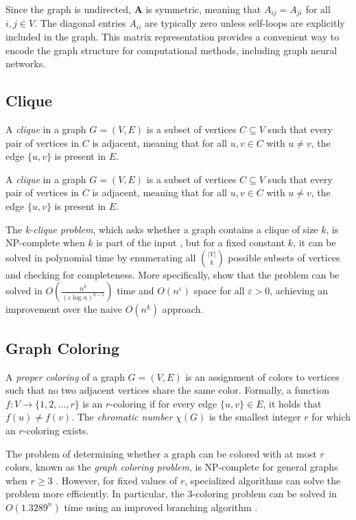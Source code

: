 Since the graph is undirected, $\mathbf{A}$ is symmetric, meaning that $A_{ij} = A_{ji}$ for all $i,j \in V$. The diagonal entries $A_{ii}$ are typically zero unless self-loops are explicitly included in the graph. This matrix representation provides a convenient way to encode the graph structure for computational methods, including graph neural networks.

\subsection{Clique}

A \textit{clique} in a graph $G = (V, E)$ is a subset of vertices $C \subseteq V$ such that every pair of vertices in $C$ is adjacent, meaning that for all $u, v \in C$ with $u \neq v$, the edge $\{u,v\}$ is present in $E$. 

A \textit{clique} in a graph $G = (V, E)$ is a subset of vertices $C \subseteq V$ such that every pair of vertices in $C$ is adjacent, meaning that for all $u, v \in C$ with $u \neq v$, the edge $\{u,v\}$ is present in $E$. 

The \textit{k-clique problem}, which asks whether a graph contains a clique of size $k$, is NP-complete when $k$ is part of the input \citep{karp1972reducibility}, but for a fixed constant $k$, it can be solved in polynomial time by enumerating all $\binom{|V|}{k}$ possible subsets of vertices and checking for completeness. More specifically, \citet{vassilevska2009efficient} show that the problem can be solved in $O\left(\frac{n^k}{(\varepsilon \log n)^{k-1}}\right)$ time and $O(n^\varepsilon)$ space for all $\varepsilon > 0$, achieving an improvement over the naive $O(n^k)$ approach.


\subsection{Graph Coloring}
A \textit{proper coloring} of a graph $G = (V, E)$ is an assignment of colors to vertices such that no two adjacent vertices share the same color. Formally, a function $f: V \to \{1,2,\dots,r\}$ is an $r$-coloring if for every edge $\{u,v\} \in E$, it holds that $f(u) \neq f(v)$. The \textit{chromatic number} $\chi(G)$ is the smallest integer $r$ for which an $r$-coloring exists.

The problem of determining whether a graph can be colored with at most $r$ colors, known as the \textit{graph coloring problem}, is NP-complete for general graphs when $r \geq 3$ \citep{karp1972reducibility}. However, for fixed values of $r$, specialized algorithms can solve the problem more efficiently. In particular, the $3$-coloring problem can be solved in $O(1.3289^n)$ time using an improved branching algorithm \citep{beigel2000finding}. 

